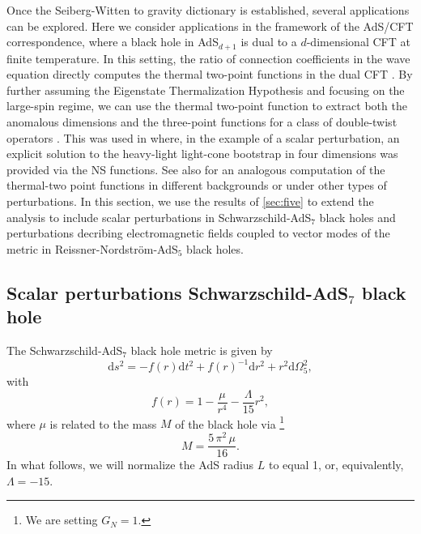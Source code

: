 \documentclass[11pt]{article}
\numberwithin{equation}{section}
\begin{document}
Once the Seiberg-Witten to gravity dictionary is established, several applications can be explored. Here we  consider  applications in the framework of the AdS/CFT correspondence, where a black hole in AdS$_{d+1}$ is dual to a $d$-dimensional CFT at finite temperature. In this setting, the ratio of connection coefficients in the wave equation directly computes the thermal two-point functions in the dual CFT \cite{Son:2002sd, Nunez:2003eq, Policastro:2002se,Kovtun:2005ev}. 
%
By further assuming the Eigenstate Thermalization Hypothesis and focusing on the large-spin regime, we can use the thermal two-point function  to extract both the anomalous dimensions and the three-point functions for a class of double-twist operators \cite{Lashkari:2016vgj,Kulaxizi:2018dxo,Karlsson:2019qfi,Karlsson:2019dbd,Karlsson:2021duj,Dodelson:2022eiz}. This was used in \cite{Dodelson:2022yvn} where, in the example of a scalar perturbation, an explicit solution to the heavy-light light-cone bootstrap in four dimensions was provided via the NS functions. See also \cite{Bhatta:2022wga, Bhatta:2023qcl,He:2023wcs,Ren:2024ifh,Jia:2024zes,BarraganAmado:2024tfu,Arnaudo:2024sen} for an analogous computation of the thermal-two point functions in different backgrounds or under other types of perturbations. 
In this section,  we use the results of \autoref{sec:five} to extend the analysis to include scalar perturbations in Schwarzschild-AdS\(_7\) black holes and  perturbations decribing 
electromagnetic fields  coupled to  vector  modes of the metric
in Reissner-Nordström-AdS\(_5\) black holes.

  
\subsection{Scalar perturbations Schwarzschild-AdS\texorpdfstring{$_7$}{} black hole}\label{sec:AdS7} 

The Schwarzschild-AdS\(_7\) black hole metric is given by
\begin{equation}\label{eq:ads7}
\mathrm{d}s^2=-f(r)\mathrm{d}t^2+f(r)^{-1}\mathrm{d}r^2+r^2\mathrm{d}\Omega^2_5,
\end{equation}
with
\begin{equation}
f(r)=1-\frac{\mu}{r^4}-\frac{\Lambda}{15}r^2,
\end{equation}
where $\mu$ is related to the mass $M$ of the black hole via \footnote{{We are setting $G_N=1$.}}
\begin{equation}
M=\frac{5\,\pi^2\,\mu}{16}.
\end{equation}
In what follows, we will normalize the AdS radius $L$ to equal 1, or, equivalently, $\Lambda=-15$.
\end{document}

